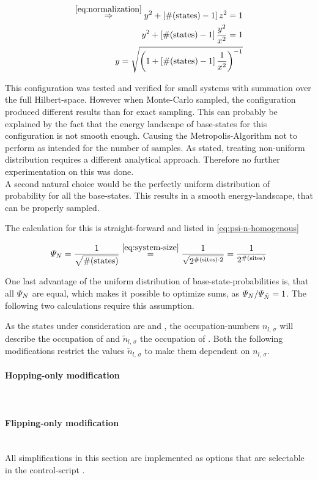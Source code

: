 \begin{equation}
    \label{eq:psi-n-concentrated}
    \begin{split}
        \stackrel{\ref{eq:normalization}}{\Rightarrow} y^2 + \left[\text{\#}(\text{states}) - 1 \right] z^2 = 1\\
        y^2 + \left[\text{\#}(\text{states}) - 1 \right] \frac{y^2}{x^2} = 1\\
        y = \sqrt{\left(1+\left[\text{\#}(\text{states}) - 1 \right]\frac{1}{x^2}\right)^{-1}}
    \end{split}
\end{equation}

This configuration was tested and verified for small systems with summation over the full Hilbert-space. 
However when Monte-Carlo sampled, the configuration produced different results than for exact sampling.
This can probably be explained by the fact that the energy landscape of base-states for this configuration is not smooth enough. 
Causing the Metropolis-Algorithm not to perform as intended for the number of samples.
As stated, treating non-uniform distribution requires a different analytical approach. Therefore no further experimentation on this was done.\\

A second natural choice would be the perfectly uniform distribution of probability for all the base-states. 
This results in a smooth energy-landscape, that can be properly sampled. 

The calculation for this is straight-forward and listed in \autoref{eq:psi-n-homogenous}

\begin{equation}
    \label{eq:psi-n-homogenous}
    \psiN{} = \frac{1}{\sqrt{\text{\#}(\text{states})}} \stackrel{\ref{eq:system-size}}{=} \frac{1}{\sqrt{2^{\text{\#}(\text{sites}) \cdot 2}}} = \frac{1}{2^{\text{\#}(\text{sites})}}
\end{equation}

One last advantage of the uniform distribution of base-state-probabilities is, that all $\psiN$ are equal, which makes it possible to optimize sums, as $\psiN{}/\psiN[\tilde{N}]{} = 1$.
The following two calculations require this assumption.

As the states under consideration are \ketN[N] and , the occupation-numbers $n_{l,\,\sigma}$ will describe the occupation of \ketN[N] and $\tilde{n}_{l,\,\sigma}$ the occupation of .
Both the following modifications restrict the values $\tilde{n}_{l,\,\sigma}$ to make them dependent on $n_{l,\,\sigma}$.

\paragraph*{Hopping-only modification} \makebox{}\\


\paragraph*{Flipping-only modification} \makebox{}\\



All simplifications in this section are implemented as options that are selectable in the control-script     .
 